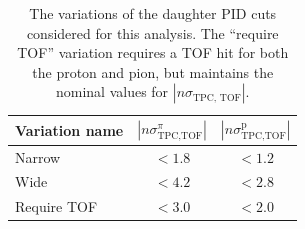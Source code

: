 \begin{table}[ht]
    \centering
    \caption{The variations of the \lmb daughter PID cuts considered for this analysis. The ``require TOF'' variation requires a TOF hit for both the proton and pion, but maintains the nominal values for $|n\sigma_{\text{TPC, TOF}}|$.}
    \label{tab:pid_cut_variations}
    \begin{tabular}{l c c}
        \hline
        Variation name & $|n\sigma_{\text{TPC}, \text{TOF}}^{\pi}|$ & $|n\sigma_{\text{TPC}, \text{TOF}}^{\text{p}}|$ \\
        \hline
        Narrow & $< 1.8$ & $< 1.2$ \\
        Wide & $< 4.2$ & $< 2.8$ \\
        Require TOF & $< 3.0$ & $< 2.0$ \\
        \hline
    \end{tabular}
\end{table}

